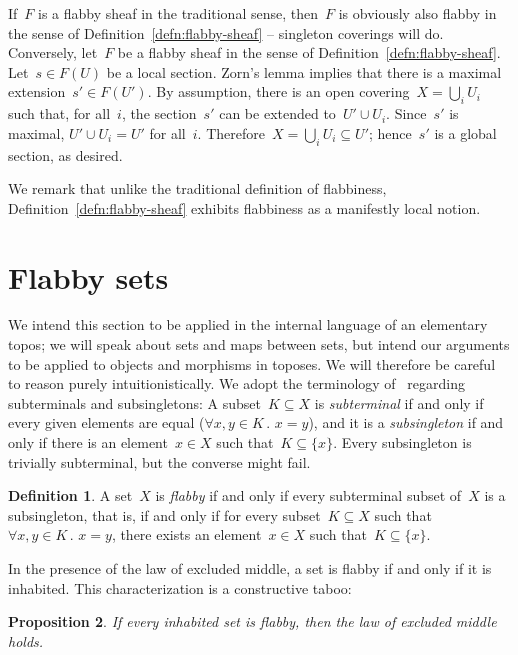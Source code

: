 \documentclass[oneside]{amsart}
\theoremstyle{definition}
\newtheorem{defn}{Definition}[section]
\theoremstyle{plain}
\newtheorem{prop}[defn]{Proposition}
\theoremstyle{remark}
\renewcommand{\_}{\mathpunct{.}\,}
\begin{document}
If~$F$ is a flabby sheaf in the traditional sense, then~$F$ is obviously also
flabby in the sense of Definition~\ref{defn:flabby-sheaf} -- singleton
coverings will do. Conversely, let~$F$ be a flabby sheaf in the sense of
Definition~\ref{defn:flabby-sheaf}. Let~$s \in F(U)$ be a local section. Zorn's
lemma implies that there is a maximal extension~$s' \in F(U')$. By assumption,
there is an open covering~$X = \bigcup_i U_i$ such that, for all~$i$, the
section~$s'$ can be extended to~$U' \cup U_i$. Since~$s'$ is maximal, $U' \cup
U_i = U'$ for all~$i$. Therefore~$X = \bigcup_i U_i \subseteq U'$; hence~$s'$ is a
global section, as desired.

We remark that unlike the traditional definition of flabbiness,
Definition~\ref{defn:flabby-sheaf} exhibits flabbiness as a manifestly local
notion.


\section{Flabby sets}\label{sect:flabby-sets}

We intend this section to be applied in the internal language of an elementary
topos; we will speak about sets and maps between sets, but intend our arguments
to be applied to objects and morphisms in toposes. We will therefore be careful
to reason purely intuitionistically. We
adopt the terminology of~\cite{kock:partial-maps} regarding subterminals and
subsingletons: A subset~$K \subseteq X$ is \emph{subterminal} if and only if every given
elements are equal ($\forall x,y \in K\_ x = y$), and it is a
\emph{subsingleton} if and only if there is an element~$x \in X$ such that~$K
\subseteq \{ x \}$. Every subsingleton is trivially subterminal, but the converse
might fail.

\begin{defn}\label{defn:flabby-set}A set~$X$ is \emph{flabby} if and only if every subterminal subset
of~$X$ is a subsingleton, that is, if and only if for every subset~$K \subseteq
X$ such that~$\forall x,y \in K\_ x = y$, there exists an element~$x \in X$
such that~$K \subseteq \{ x \}$.
\end{defn}

In the presence of the law of excluded middle, a set is flabby if and only if
it is inhabited. This characterization is a constructive taboo:

\begin{prop}\label{prop:taboo}
If every inhabited set is flabby, then the law of excluded middle
holds.
\end{prop}
\end{document}
